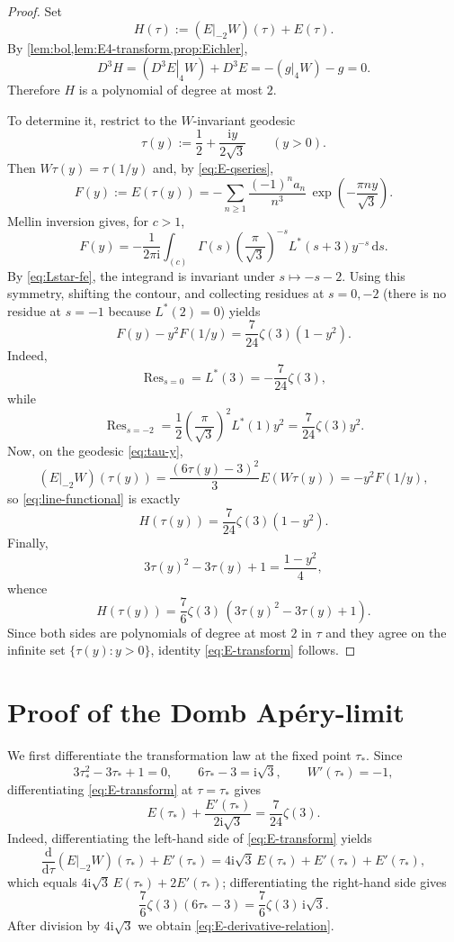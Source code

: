 \documentclass[11pt]{amsart}
\theoremstyle{definition}
\theoremstyle{remark}
\newcommand{\dd}{\mathrm{d}}
\newcommand{\ii}{\mathrm{i}}
\newcommand{\Dop}{D}
\newcommand{\wt}[2]{\left.#1\right|_{#2}W}
\DeclareMathOperator{\Res}{Res}
\begin{document}
\begin{proof}
Set
\[
H(\tau):=(\wt{E}{-2})(\tau)+E(\tau).
\]
By \cref{lem:bol,lem:E4-transform,prop:Eichler},
\[
\Dop^3H=(\wt{\Dop^3E}{4})+\Dop^3E=-(g|_4W)-g=0.
\]
Therefore $H$ is a polynomial of degree at most $2$.

To determine it, restrict to the $W$-invariant geodesic
\begin{equation}\label{eq:tau-y}
\tau(y):=\frac12+\frac{\ii y}{2\sqrt 3}
\qquad(y>0).
\end{equation}
Then $W\tau(y)=\tau(1/y)$ and, by \eqref{eq:E-qseries},
\begin{equation}\label{eq:F-y-def}
F(y):=E(\tau(y))=-\sum_{n\ge 1}\frac{(-1)^na_n}{n^3}\,\exp\!\left(-\frac{\pi n y}{\sqrt 3}\right).
\end{equation}
Mellin inversion gives, for $c>1$,
\begin{equation}\label{eq:Mellin-E}
F(y)=-\frac{1}{2\pi\ii}\int_{(c)}\Gamma(s)\left(\frac{\pi}{\sqrt 3}\right)^{-s}L^*(s+3)y^{-s}\,\dd s.
\end{equation}
By \eqref{eq:Lstar-fe}, the integrand is invariant under $s\mapsto -s-2$. Using this symmetry, shifting the contour, and collecting residues at $s=0,-2$ (there is no residue at $s=-1$ because $L^*(2)=0$) yields
\begin{equation}\label{eq:line-functional}
F(y)-y^2F(1/y)=\frac{7}{24}\zeta(3)(1-y^2).
\end{equation}
Indeed,
\[
\Res_{s=0}=L^*(3)=-\frac{7}{24}\zeta(3),
\]
while
\[
\Res_{s=-2}=\frac{1}{2}\left(\frac{\pi}{\sqrt 3}\right)^2L^*(1)y^2
=\frac{7}{24}\zeta(3)y^2.
\]
Now, on the geodesic \eqref{eq:tau-y},
\[
(\wt{E}{-2})(\tau(y))
=\frac{(6\tau(y)-3)^2}{3}E(W\tau(y))
=-y^2F(1/y),
\]
so \eqref{eq:line-functional} is exactly
\[
H(\tau(y))=\frac{7}{24}\zeta(3)(1-y^2).
\]
Finally,
\[
3\tau(y)^2-3\tau(y)+1=\frac{1-y^2}{4},
\]
whence
\[
H(\tau(y))=\frac{7}{6}\zeta(3)\,(3\tau(y)^2-3\tau(y)+1).
\]
Since both sides are polynomials of degree at most $2$ in $\tau$ and they agree on the infinite set $\{\tau(y):y>0\}$, identity \eqref{eq:E-transform} follows.
\end{proof}

\section{Proof of the Domb Apéry-limit}\label{sec:proof-A}

We first differentiate the transformation law at the fixed point $\tau_*$. Since
\[
3\tau_*^2-3\tau_*+1=0,
\qquad 6\tau_*-3=\ii\sqrt 3,
\qquad W'(\tau_*)=-1,
\]
differentiating \eqref{eq:E-transform} at $\tau=\tau_*$ gives
\begin{equation}\label{eq:E-derivative-relation}
E(\tau_*)+\frac{E'(\tau_*)}{2\ii\sqrt 3}=\frac{7}{24}\zeta(3).
\end{equation}
Indeed, differentiating the left-hand side of \eqref{eq:E-transform} yields
\[
\frac{\dd}{\dd\tau}(\wt{E}{-2})(\tau_*)+E'(\tau_*)=4\ii\sqrt 3\,E(\tau_*)+E'(\tau_*)+E'(\tau_*),
\]
which equals $4\ii\sqrt3\,E(\tau_*)+2E'(\tau_*)$; differentiating the right-hand side gives
\[
\frac{7}{6}\zeta(3)(6\tau_*-3)=\frac{7}{6}\zeta(3)\,\ii\sqrt 3.
\]
After division by $4\ii\sqrt 3$ we obtain \eqref{eq:E-derivative-relation}.
\end{document}
